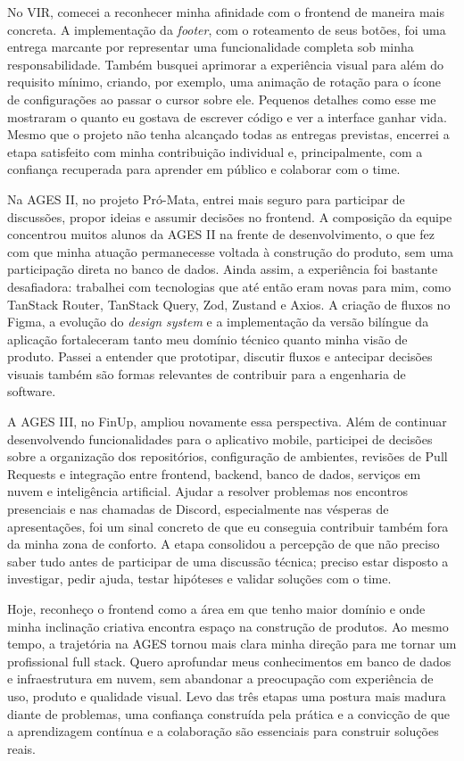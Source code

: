 No VIR, comecei a reconhecer minha afinidade com o frontend de maneira mais
concreta. A implementação da \textit{footer}, com o roteamento de seus botões,
foi uma entrega marcante por representar uma funcionalidade completa sob minha
responsabilidade. Também busquei aprimorar a experiência visual para além do
requisito mínimo, criando, por exemplo, uma animação de rotação para o ícone de
configurações ao passar o cursor sobre ele. Pequenos detalhes como esse me
mostraram o quanto eu gostava de escrever código e ver a interface ganhar vida.
Mesmo que o projeto não tenha alcançado todas as entregas previstas, encerrei a
etapa satisfeito com minha contribuição individual e, principalmente, com a
confiança recuperada para aprender em público e colaborar com o time.

Na AGES II, no projeto Pró-Mata, entrei mais seguro para participar de
discussões, propor ideias e assumir decisões no frontend. A composição da equipe
concentrou muitos alunos da AGES II na frente de desenvolvimento, o que fez com
que minha atuação permanecesse voltada à construção do produto, sem uma
participação direta no banco de dados. Ainda assim, a experiência foi bastante
desafiadora: trabalhei com tecnologias que até então eram novas para mim, como
TanStack Router, TanStack Query, Zod, Zustand e Axios. A criação de fluxos no
Figma, a evolução do \textit{design system} e a implementação da versão
bilíngue da aplicação fortaleceram tanto meu domínio técnico quanto minha visão
de produto. Passei a entender que prototipar, discutir fluxos e antecipar
decisões visuais também são formas relevantes de contribuir para a engenharia
de software.

A AGES III, no FinUp, ampliou novamente essa perspectiva. Além de continuar
desenvolvendo funcionalidades para o aplicativo mobile, participei de decisões
sobre a organização dos repositórios, configuração de ambientes, revisões de
Pull Requests e integração entre frontend, backend, banco de dados, serviços em
nuvem e inteligência artificial. Ajudar a resolver problemas nos encontros
presenciais e nas chamadas de Discord, especialmente nas vésperas de
apresentações, foi um sinal concreto de que eu conseguia contribuir também fora
da minha zona de conforto. A etapa consolidou a percepção de que não preciso
saber tudo antes de participar de uma discussão técnica; preciso estar disposto
a investigar, pedir ajuda, testar hipóteses e validar soluções com o time.

Hoje, reconheço o frontend como a área em que tenho maior domínio e onde minha
inclinação criativa encontra espaço na construção de produtos. Ao mesmo tempo,
a trajetória na AGES tornou mais clara minha direção para me tornar um
profissional full stack. Quero aprofundar meus conhecimentos em banco de dados
e infraestrutura em nuvem, sem abandonar a preocupação com experiência de uso,
produto e qualidade visual. Levo das três etapas uma postura mais madura diante
de problemas, uma confiança construída pela prática e a convicção de que a
aprendizagem contínua e a colaboração são essenciais para construir soluções
reais.
